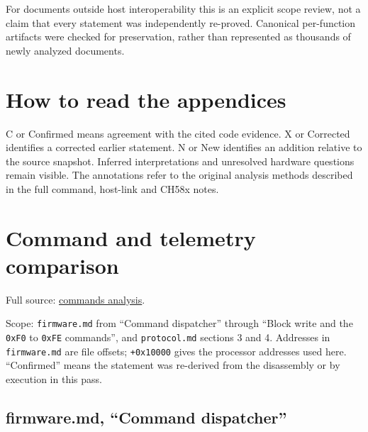 For documents outside host interoperability this is an explicit scope
review, not a claim that every statement was independently re-proved.
Canonical per-function artifacts were checked for preservation, rather
than represented as thousands of newly analyzed documents.

\section{How to read the appendices}\label{how-to-read-the-appendices}

C or Confirmed means agreement with the cited code evidence. X or
Corrected identifies a corrected earlier statement. N or New identifies
an addition relative to the source snapshot. Inferred interpretations
and unresolved hardware questions remain visible. The annotations refer
to the original analysis methods described in the full command,
host-link and CH58x notes.

\section{Command and telemetry
comparison}\label{command-and-telemetry-comparison}

Full source: \href{notes/commands.md}{commands analysis}.

Scope: \texttt{firmware.md} from ``Command dispatcher'' through ``Block
write and the \texttt{0xF0} to \texttt{0xFE} commands'', and
\texttt{protocol.md} sections 3 and 4. Addresses in \texttt{firmware.md}
are file offsets; \texttt{+0x10000} gives the processor addresses used
here. ``Confirmed'' means the statement was re-derived from the
disassembly or by execution in this pass.

\subsection{firmware.md, ``Command
dispatcher''}\label{firmware.md-command-dispatcher}

